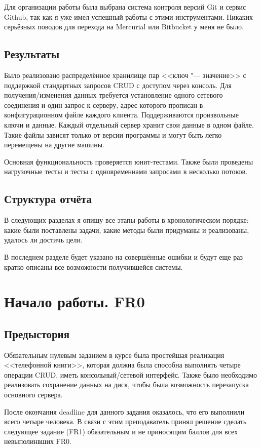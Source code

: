 \documentclass[a4paper]{article}
\begin{document}
  Для организации работы была выбрана система контроля версий Git и сервис Github, так как я уже
  имел успешный работы с этими инструментами. Никаких серьёзных поводов для перехода на Mercurial
  или Bitbucket у меня не было.

\subsection{Результаты}
  Было реализовано распределённое хранилище пар <<ключ "--- значение>> с поддержкой стандартных
  запросов CRUD с доступом через консоль. Для получения/изменения данных требуется установление
  одного сетевого соединения и один запрос к серверу, адрес которого прописан в конфигурационном файле
  каждого клиента. Поддерживаются произвольные ключи и данные. Каждый отдельный сервер хранит свои
  данные в одном файле. Такие файлы зависят только от версии программы и могут быть легко
  перемещены на другие машины.

  Основная функциональность проверяется юнит-тестами. Также были проведены нагрузочные тесты и
  тесты с одновременнами запросами в несколько потоков.

\subsection{Структура отчёта}
  В следующих разделах я опишу все этапы работы в хронологическом порядке: какие были поставлены задачи,
  какие методы были придуманы и реализованы, удалось ли достичь цели.

  В последнем разделе будет указано на совершённые ошибки и будут еще раз кратко описаны все возможности
  получившейся системы.

\section{Начало работы. FR0}
\subsection{Предыстория}
  Обязательным нулевым заданием в курсе была простейшая реализация <<телефонной книги>>, которая должна
  была способна выполнять четыре операции CRUD, иметь консольный/сетевой интерфейс. Также было необходимо
  реализовать сохранение данных на диск, чтобы была возможность перезапуска основного сервера.

  После окончания deadline для данного задания оказалось, что его выполнили всего четыре человека. В связи
  с этим преподаватель принял решение сделать следующее задание (FR1) обязательным и не приносящим баллов
  для всех невыполинвших FR0.
\end{document}
